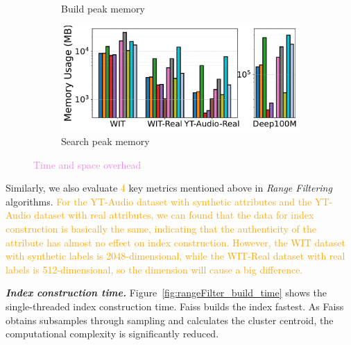 \documentclass[sigconf, nonacm]{acmart}
\begin{document}
\begin{figure}[t]
\begin{subfigure}[t]{0.495\columnwidth}
			\caption{\footnotesize Build peak memory}
			\label{fig:rangeFilter_build_memory_mb}
		\end{subfigure}
		\hfill
		\begin{subfigure}[t]{0.495\columnwidth}
			\centering
			\includegraphics[width=\linewidth]{figures/searchMem/range_memory_comparison.pdf}
			\caption{\footnotesize Search peak memory}
			\label{fig:rangeFilter_search_memory_mb}
		\end{subfigure}
		
		\caption{\textcolor{violet}{Time and space overhead}}
		\label{fig:rangeFilter_build_index_comparison}
	\end{figure}
	
	Similarly, we also evaluate \textcolor{orange}{4} key metrics mentioned above in \textit{Range Filtering} algorithms. \textcolor{orange}{For the YT-Audio dataset with synthetic attributes and the YT-Audio dataset with real attributes, we can found that the data for index construction is basically the same, indicating that the authenticity of the attribute has almost no effect on index construction.
	However, the WIT dataset with synthetic labels is 2048-dimensional, while the WIT-Real dataset with real labels is 512-dimensional, so the dimension will cause a big difference.}
	
	\textit{\textbf{Index construction time.}}
	Figure~\ref{fig:rangeFilter_build_time} shows the single-threaded index construction time. Faiss builds the index fastest. As Faiss obtains subsamples through sampling and calculates the cluster centroid, the computational complexity is significantly reduced.
	
\end{document}
